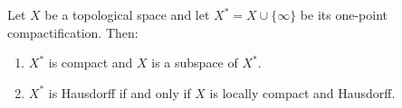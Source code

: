 Let $X$ be a topological space and let $X^* = X \cup \{\infty\}$ be its one-point compactification. Then:
\begin{enumerate}
\item $X^*$ is compact and $X$ is a subspace of $X^*$.
\item $X^*$ is Hausdorff if and only if $X$ is locally compact and Hausdorff.
\end{enumerate}
